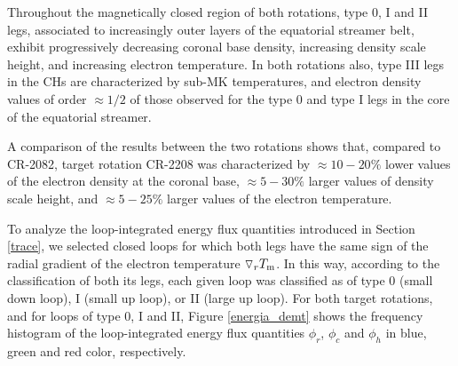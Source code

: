 \documentclass[namedreferences]{solarphysics}
\newcommand{\dr}{\triangledown_r}
\newcommand{\Tm}{T_{\rm m}}
\begin{document}
\begin{article}
{Throughout the magnetically closed region of both rotations, type 0, I and II legs, associated to  increasingly outer layers of the equatorial streamer belt, exhibit progressively decreasing coronal base density, increasing density scale height, and increasing electron temperature. In both rotations also, type III legs in the CHs are characterized by sub-MK temperatures, and electron density values of order $\approx 1/2$ of those observed for the type 0 and type I legs in the core of the equatorial streamer.}

{A comparison of the results between the two rotations shows that, compared to CR-2082, target rotation CR-2208 was characterized by {$\approx 10-20\%$} lower values of the electron density at the coronal base, $\approx 5-30\%$ larger values of density scale height, and {$\approx 5-25\%$} larger values of the electron temperature.} 

{To analyze the loop-integrated energy flux quantities introduced in Section \ref{trace}, we selected closed loops for which both legs have the same sign of the radial gradient of the electron temperature $\dr\Tm$.} In this way, according to the classification of both its legs, each given loop was classified as of type 0 (small down loop), I (small up loop), or II (large up loop). {For both target rotations, and for loops of type 0, I and II, Figure \ref{energia_demt} shows the frequency histogram of the loop-integrated energy flux quantities {$\phi_r$, $\phi_c$ and $\phi_h$ in blue, green and red color}, respectively.}


\end{article}
\end{document}
